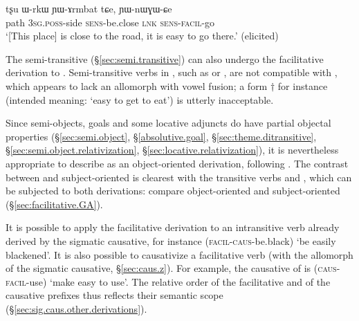 \begin{exe}
\ex \label{ex:YWnWGWCe}
\gll  tʂu ɯ-rkɯ ɲɯ-ɤrmbat tɕe, ɲɯ-nɯɣɯ-ɕe \\
path \textsc{3sg}.\textsc{poss}-side \textsc{sens}-be.close \textsc{lnk} \textsc{sens}-\textsc{facil}-go \\
\glt `[This place] is close to the road, it is easy to go there.' (elicited)
\end{exe}

The semi-transitive  (§\ref{sec:semi.transitive}) can also undergo the facilitative derivation to . Semi-transitive verbs in , such as  or , are not compatible with , which appears to lack an allomorph with vowel fusion; a form $\dagger$ for instance (intended meaning: `easy to get to eat') is utterly inacceptable.

Since semi-objects, goals and some locative adjuncts do have partial objectal properties (§\ref{sec:semi.object}, §\ref{absolutive.goal}, §\ref{sec:theme.ditransitive}, §\ref{sec:semi.object.relativization}, §\ref{sec:locative.relativization}), it is nevertheless appropriate to describe  as an object-oriented derivation, following \citet{jackson14morpho}. The contrast between  and subject-oriented  is clearest with the transitive verbs  and , which can be subjected to both derivations: compare object-oriented  and subject-oriented   (§\ref{sec:facilitative.GA}).

It is possible to apply the facilitative derivation to an intransitive verb already derived by the sigmatic causative, for instance  (\textsc{facil}-\textsc{caus}-be.black) `be easily blackened'. It is also possible to causativize a facilitative verb (with the  allomorph of the sigmatic causative, §\ref{sec:caus.z}). For example, the causative of  is  (\textsc{caus}-\textsc{facil}-use) `make easy to use'. The relative order of the facilitative and of the causative prefixes thus reflects their semantic scope (§\ref{sec:sig.caus.other.derivations}).


